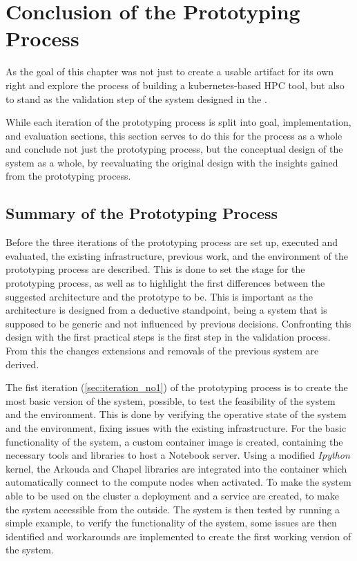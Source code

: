 \section{Conclusion of the Prototyping Process}

As the goal of this chapter was not just to create a usable artifact for its own right
and explore the process of building a kubernetes-based \ac{HPC} tool,
but also to stand as the validation step of the system designed in the .

While each iteration of the prototyping process is split into goal, implementation, and evaluation
sections, this section serves to do this for the process as a whole and conclude not just the prototyping process,
but the conceptual design of the system as a whole,
by reevaluating the original design with the insights gained from the prototyping process.


\subsection{Summary of the Prototyping Process}

Before the three iterations of the prototyping process are set up, executed and evaluated,
the existing infrastructure, previous work, and the environment of the prototyping process are described.
This is done to set the stage for the prototyping process, as well as to
highlight the first differences between the suggested architecture and the prototype to be.
This is important as the architecture is designed from a deductive standpoint,
being a system that is supposed to be generic and not influenced by previous decisions.
Confronting this design with the first practical steps is the first step in the validation process.
From this the changes extensions and removals of the previous system are derived.

The fist iteration (\ref{sec:iteration_no1}) of the prototyping process is to create the most basic version of the system,
possible, to test the feasibility of the system and the environment.
This is done by verifying the operative state of the system and the environment,
fixing issues with the existing infrastructure.
For the basic functionality of the system, a custom container image is created,
containing the necessary tools and libraries to host a Notebook server.
Using a modified \textit{Ipython} kernel, the Arkouda and Chapel libraries are
integrated into the container which automatically connect to the compute nodes when
activated. To make the system able to be used on the cluster a deployment and a
service are created, to make the system accessible from the outside.
The system is then tested by running a simple example, to verify the functionality of the system,
some issues are then identified and workarounds are implemented to create the first working version of the system.

